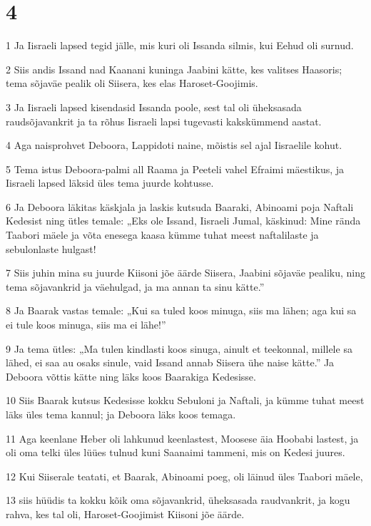 \chapter{4}

\par 1 Ja Iisraeli lapsed tegid jälle, mis kuri oli Issanda silmis, kui Eehud oli surnud.
\par 2 Siis andis Issand nad Kaanani kuninga Jaabini kätte, kes valitses Haasoris; tema sõjaväe pealik oli Siisera, kes elas Haroset-Goojimis.
\par 3 Ja Iisraeli lapsed kisendasid Issanda poole, sest tal oli üheksasada raudsõjavankrit ja ta rõhus Iisraeli lapsi tugevasti kakskümmend aastat.
\par 4 Aga naisprohvet Deboora, Lappidoti naine, mõistis sel ajal Iisraelile kohut.
\par 5 Tema istus Deboora-palmi all Raama ja Peeteli vahel Efraimi mäestikus, ja Iisraeli lapsed läksid üles tema juurde kohtusse.
\par 6 Ja Deboora läkitas käskjala ja laskis kutsuda Baaraki, Abinoami poja Naftali Kedesist ning ütles temale: „Eks ole Issand, Iisraeli Jumal, käskinud: Mine rända Taabori mäele ja võta enesega kaasa kümme tuhat meest naftalilaste ja sebulonlaste hulgast!
\par 7 Siis juhin mina su juurde Kiisoni jõe äärde Siisera, Jaabini sõjaväe pealiku, ning tema sõjavankrid ja väehulgad, ja ma annan ta sinu kätte.”
\par 8 Ja Baarak vastas temale: „Kui sa tuled koos minuga, siis ma lähen; aga kui sa ei tule koos minuga, siis ma ei lähe!”
\par 9 Ja tema ütles: „Ma tulen kindlasti koos sinuga, ainult et teekonnal, millele sa lähed, ei saa au osaks sinule, vaid Issand annab Siisera ühe naise kätte.” Ja Deboora võttis kätte ning läks koos Baarakiga Kedesisse.
\par 10 Siis Baarak kutsus Kedesisse kokku Sebuloni ja Naftali, ja kümme tuhat meest läks üles tema kannul; ja Deboora läks koos temaga.
\par 11 Aga keenlane Heber oli lahkunud keenlastest, Moosese äia Hoobabi lastest, ja oli oma telki üles lüües tulnud kuni Saanaimi tammeni, mis on Kedesi juures.
\par 12 Kui Siiserale teatati, et Baarak, Abinoami poeg, oli läinud üles Taabori mäele,
\par 13 siis hüüdis ta kokku kõik oma sõjavankrid, üheksasada raudvankrit, ja kogu rahva, kes tal oli, Haroset-Goojimist Kiisoni jõe äärde.
